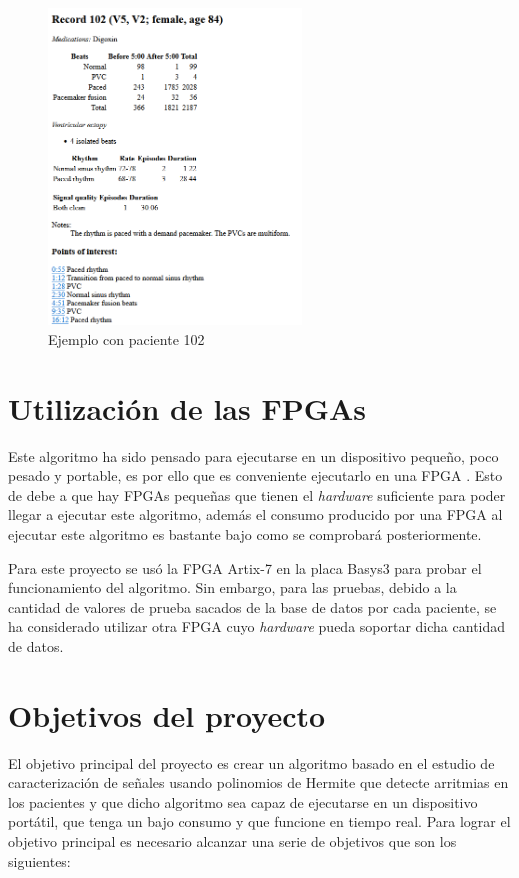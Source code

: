 \begin{figure}[h]
	\centering
	\includegraphics[width=0.6\textwidth]{./Images/img_introduccion/Paciente_pruebas_MIT.png}
	\caption{Ejemplo con paciente 102 \cite{mitdb}}
	\label{fig:Paciente_pruebas_MIT}
\end{figure}

\section{Utilización de las FPGAs}
Este algoritmo ha sido pensado para ejecutarse en un dispositivo pequeño, poco pesado y portable, es por ello que es conveniente ejecutarlo en una FPGA \cite{mdpi_sensors_2014}. Esto de debe a que hay FPGAs pequeñas que tienen el  \textit{hardware}  suficiente para poder llegar a ejecutar este algoritmo, además el consumo producido por una FPGA al ejecutar este algoritmo es bastante bajo como se comprobará posteriormente.

Para este proyecto se usó la FPGA Artix-7 \cite{xilinx_artix7} en la placa Basys3 para probar el funcionamiento del algoritmo. Sin embargo, para las pruebas, debido a la cantidad de valores de prueba sacados de la base de datos por cada paciente, se ha considerado utilizar otra FPGA cuyo  \textit{hardware}  pueda soportar dicha cantidad de datos.


\section{Objetivos del proyecto}

El objetivo principal del proyecto es crear un algoritmo basado en el estudio de caracterización de señales usando polinomios de Hermite \cite{desai2021low} que detecte arritmias en los pacientes y que dicho algoritmo sea capaz de ejecutarse en un dispositivo portátil, que tenga un bajo consumo y que funcione en tiempo real. Para lograr el objetivo principal es necesario alcanzar una serie de objetivos que son los siguientes:


